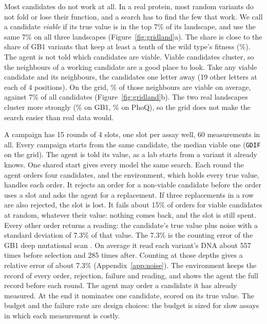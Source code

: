 Most candidates do not work at all. In a real protein, most random variants do not fold or
lose their function, and a search has to find the few that work. We call a candidate \emph{viable} if its true value is in the top 7\%
of its landscape, and use the same 7\% on all three landscapes (Figure~\ref{fig:gridland}a). The share is close to the share of GB1 variants that keep at least a tenth of the
wild type's fitness (\nGbViable\%). The agent is not told which candidates are viable. Viable candidates cluster, so the neighbours of a working candidate are a good place to look. Take any viable candidate
and its \nNbrPer{} neighbours, the candidates one letter away (19 other letters at each of 4 positions). On the grid, \nNbrViableGrid\% of those neighbours are viable on average, against 7\% of all candidates
(Figure~\ref{fig:gridland}b). The two real landscapes cluster more strongly (\nNbrViableGb\% on GB1,
\nNbrViablePq\% on PhoQ), so the grid does not make the search easier than real data would.

A campaign has 15 rounds of 4 slots, one slot per assay well, 60 measurements in all. Every campaign starts from the
same candidate, the median viable one (\texttt{GDIF} on the grid). The agent is told its value, as a lab starts
from a variant it already knows. One shared start gives every model the same search. Each round the agent orders
four candidates, and the environment, which holds every true value, handles each order. It rejects an order for a
non-viable candidate before the order uses a slot and asks the agent for a replacement. If three replacements in a
row are also rejected, the slot is lost. It fails about 15\% of orders for viable candidates at random, whatever
their value: nothing comes back, and the slot is still spent. Every other order returns a reading: the candidate's
true value plus noise with a standard deviation of 7.3\% of that value. The 7.3\% is the counting error of the
GB1 deep mutational scan \citep{wu2016adaptation}. On average it read each variant's DNA about 557 times before selection and 285 times after. Counting at those depths gives a relative error of about 7.3\% (Appendix~\ref{app:noise}). The environment keeps the record of
every order, rejection, failure and reading, and shows the agent the full record before each round. The agent may
order a candidate it has already measured. At the end it nominates one candidate, scored on its true value. The budget and the failure rate are design choices: the budget is sized for slow assays in which each measurement is costly.


